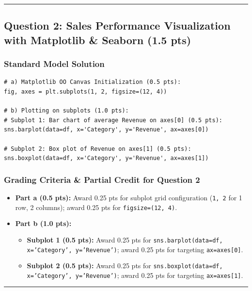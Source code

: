 \documentclass[11pt,a4paper]{article}
\begin{document}
\vspace{2mm}
\hrule
\vspace{2mm}

\subsection*{Question 2: Sales Performance Visualization with Matplotlib \& Seaborn (1.5 pts)}

\subsubsection*{Standard Model Solution}
\begin{lstlisting}
# a) Matplotlib OO Canvas Initialization (0.5 pts):
fig, axes = plt.subplots(1, 2, figsize=(12, 4))

# b) Plotting on subplots (1.0 pts):
# Subplot 1: Bar chart of average Revenue on axes[0] (0.5 pts):
sns.barplot(data=df, x='Category', y='Revenue', ax=axes[0])

# Subplot 2: Box plot of Revenue on axes[1] (0.5 pts):
sns.boxplot(data=df, x='Category', y='Revenue', ax=axes[1])
\end{lstlisting}

\subsubsection*{Grading Criteria \& Partial Credit for Question 2}
\begin{itemize}[leftmargin=*, itemsep=3.5pt]
  \item \textbf{Part a (0.5 pts):} Award 0.25 pts for subplot grid configuration (\texttt{1, 2} for 1 row, 2 columns); award 0.25 pts for \texttt{figsize=(12, 4)}.
  \item \textbf{Part b (1.0 pts):}
  \begin{itemize}
    \item \textbf{Subplot 1 (0.5 pts):} Award 0.25 pts for \texttt{sns.barplot(data=df, x='Category', y='Revenue')}; award 0.25 pts for targeting \texttt{ax=axes[0]}.
    \item \textbf{Subplot 2 (0.5 pts):} Award 0.25 pts for \texttt{sns.boxplot(data=df, x='Category', y='Revenue')}; award 0.25 pts for targeting \texttt{ax=axes[1]}.
  \end{itemize}
\end{itemize}

\vspace{2mm}
\hrule
\vspace{2mm}
\end{document}
